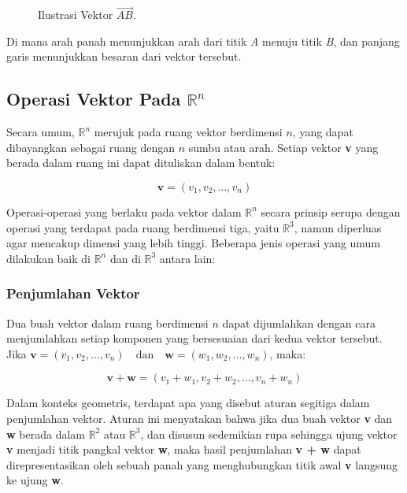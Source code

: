 \documentclass[a4paper,12pt]{report}
\numberwithin{equation}{chapter}
\begin{document}
\begin{figure}[h]
    \centering
    \caption{Ilustrasi Vektor $\overrightarrow{AB}$.}
    \label{fig:vektor}
\end{figure}

Di mana arah panah menunjukkan arah dari titik \textit{A} menuju titik \textit{B}, dan panjang garis menunjukkan besaran dari vektor tersebut.

\subsection{Operasi Vektor Pada $\mathbb{R}^n$}
Secara umum, $\mathbb{R}^n$ merujuk pada ruang vektor berdimensi $n$, yang dapat dibayangkan sebagai ruang dengan $n$ sumbu atau arah. Setiap vektor \textbf{v} yang berada dalam ruang ini dapat dituliskan dalam bentuk:

\[
\mathbf{v} = (v_1,v_2,\ldots,v_n)
\]

Operasi-operasi yang berlaku pada vektor dalam $\mathbb{R}^n$ secara prinsip serupa dengan operasi yang terdapat pada ruang berdimensi tiga, yaitu $\mathbb{R}^3$, namun diperluas agar mencakup dimensi yang lebih tinggi. Beberapa jenis operasi yang umum dilakukan baik di $\mathbb{R}^n$ dan di $\mathbb{R}^3$ antara lain:

\subsubsection{Penjumlahan Vektor} 
Dua buah vektor dalam ruang berdimensi $n$ dapat dijumlahkan dengan cara menjumlahkan setiap komponen yang bersesuaian dari kedua vektor tersebut. Jika $\mathbf{v} = (v_1, v_2, \ldots, v_n) \quad \text{dan} \quad \mathbf{w} = (w_1, w_2, \ldots, w_n)$, maka:

\[
    \mathbf{v} + \mathbf{w} = (v_1 + w_1, v_2 + w_2, \ldots, v_n + w_n)
\]

Dalam konteks geometris, terdapat apa yang disebut aturan segitiga dalam penjumlahan vektor. Aturan ini menyatakan bahwa jika dua buah vektor \textbf{v} dan \textbf{w} berada dalam $\mathbb{R}^2$ atau $\mathbb{R}^3$, dan disusun sedemikian rupa sehingga ujung vektor \textbf{v} menjadi titik pangkal vektor \textbf{w}, maka hasil penjumlahan \textbf{v + w} dapat direpresentasikan oleh sebuah panah yang menghubungkan titik awal \textbf{v} langsung ke ujung \textbf{w}.
\end{document}
